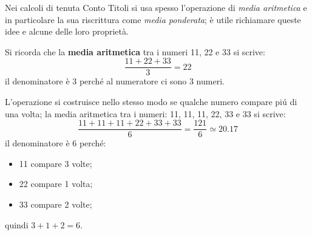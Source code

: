 \documentclass[12pt,a4paper]{article}
\begin{document}
Nei  calcoli  di tenuta  Conto  Titoli  si  usa  spesso l'operazione  di  \emph{media
   aritmetica} e  in particolare  la sua riscrittura  come \emph{media  ponderata}; è
utile richiamare queste idee e alcune delle loro proprietà.

Si  ricorda che  la  \textbf{media  aritmetica} tra  i  numeri  \num{11}, \num{22}  e
\num{33} si scrive:
\begin{equation*}
  \frac{\num{11} + \num{22} + \num{33}}{3} = \num{22}
\end{equation*}
il denominatore è \num{3} perché al numeratore ci sono \num{3} numeri.

L'operazione si  costruisce nello stesso  modo se qualche  numero compare piú  di una
volta;  la media  aritmetica tra  i numeri:  \num{11}, \num{11},  \num{11}, \num{22},
\num{33} e \num{33} si scrive:
\begin{equation*}
  \frac{\num{11} + \num{11} + \num{11} + \num{22} + \num{33} + \num{33}}{6}
  = \frac{121}{6} \simeq \num{20,17}
\end{equation*}
il denominatore è \num{6} perché:
\begin{itemize}
\item \num{11} compare \num{3} volte;
\item \num{22} compare \num{1} volta;
\item \num{33} compare \num{2} volte;
\end{itemize}
quindi \(\num{3} + \num{1} + \num{2} = \num{6}\).
\end{document}
